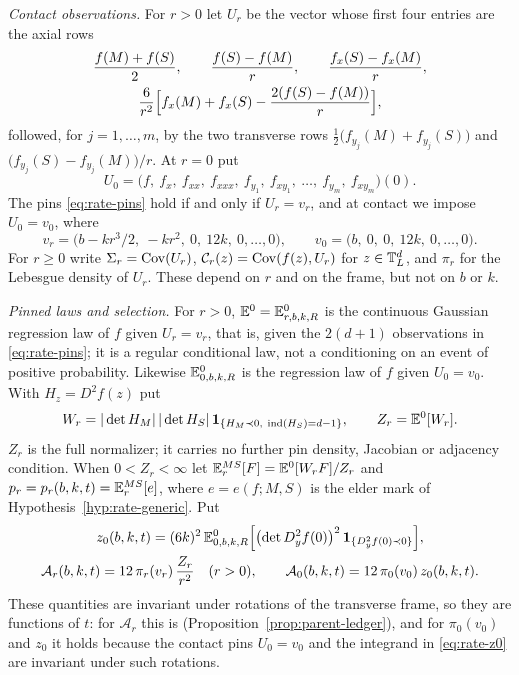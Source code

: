 \emph{Contact observations.} For $r>0$ let $U_r$ be the vector whose first four entries are the axial rows
\begin{equation}\label{eq:rate-rows}
\begin{gathered}
\frac{f(M)+f(S)}2,\qquad\frac{f(S)-f(M)}r,\qquad\frac{f_x(S)-f_x(M)}r,\\
\frac6{r^2}\Bigl[f_x(M)+f_x(S)-\frac{2(f(S)-f(M))}r\Bigr],
\end{gathered}
\end{equation}
followed, for $j=1,\dots,m$, by the two transverse rows $\frac12\bigl(f_{y_j}(M)+f_{y_j}(S)\bigr)$ and $\bigl(f_{y_j}(S)-f_{y_j}(M)\bigr)/r$. At $r=0$ put
\begin{equation}\label{eq:rate-U0}
U_0=\bigl(f,\ f_x,\ f_{xx},\ f_{xxx},\ f_{y_1},\ f_{xy_1},\ \dots,\ f_{y_m},\ f_{xy_m}\bigr)(0).
\end{equation}
The pins \eqref{eq:rate-pins} hold if and only if $U_r=v_r$, and at contact we impose $U_0=v_0$, where
\begin{equation}\label{eq:rate-target}
v_r=\bigl(b-kr^3/2,\ -kr^2,\ 0,\ 12k,\ 0,\dots,0\bigr),\qquad v_0=\bigl(b,\ 0,\ 0,\ 12k,\ 0,\dots,0\bigr).
\end{equation}
For $r\ge0$ write $\Sigma_r=\operatorname{Cov}(U_r)$, $\mathcal C_r(z)=\operatorname{Cov}(f(z),U_r)$ for $z\in\mathbb T^d_L$, and $\pi_r$ for the Lebesgue density of $U_r$. These depend on $r$ and on the frame, but not on $b$ or $k$.

\emph{Pinned laws and selection.} For $r>0$, $\mathbb E^0=\mathbb E^0_{r,b,k,R}$ is the continuous Gaussian regression law of $f$ given $U_r=v_r$, that is, given the $2(d+1)$ observations in \eqref{eq:rate-pins}; it is a regular conditional law, not a conditioning on an event of positive probability. Likewise $\mathbb E^0_{0,b,k,R}$ is the regression law of $f$ given $U_0=v_0$. With $H_z=D^2f(z)$ put
\begin{equation}\label{eq:rate-W}
W_r=|\det H_M|\,|\det H_S|\,\mathbf 1_{\{H_M\prec0,\ \operatorname{ind}(H_S)=d-1\}},\qquad Z_r=\mathbb E^0[W_r].
\end{equation}
$Z_r$ is the full normalizer; it carries no further pin density, Jacobian or adjacency condition. When $0<Z_r<\infty$ let $\mathbb E^{MS}_r[F]=\mathbb E^0[W_rF]/Z_r$ and $p_r=p_r(b,k,t)=\mathbb E^{MS}_r[e]$, where $e=e(f;M,S)$ is the elder mark of Hypothesis~\ref{hyp:rate-generic}. Put
\begin{gather}
z_0(b,k,t)=(6k)^2\,\mathbb E^0_{0,b,k,R}\Bigl[\bigl(\det D_y^2f(0)\bigr)^2\,\mathbf 1_{\{D_y^2f(0)\prec0\}}\Bigr],\label{eq:rate-z0}\\
\mathcal A_r(b,k,t)=12\,\pi_r(v_r)\,\frac{Z_r}{r^2}\quad(r>0),\qquad \mathcal A_0(b,k,t)=12\,\pi_0(v_0)\,z_0(b,k,t).\label{eq:rate-A}
\end{gather}
These quantities are invariant under rotations of the transverse frame, so they are functions of $t$: for $\mathcal A_r$ this is \cite[\S10]{parentP} (Proposition~\ref{prop:parent-ledger}), and for $\pi_0(v_0)$ and $z_0$ it holds because the contact pins $U_0=v_0$ and the integrand in \eqref{eq:rate-z0} are invariant under such rotations.

